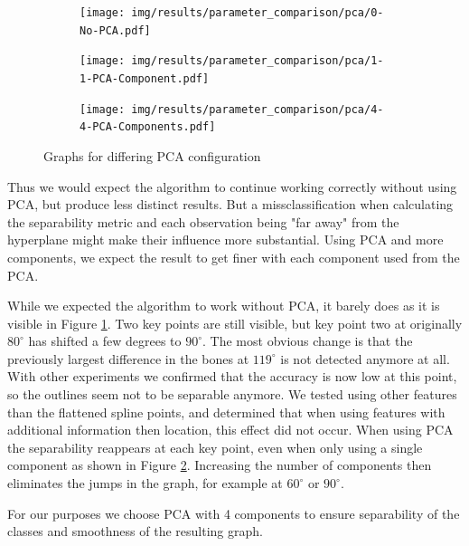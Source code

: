 \documentclass[pdftex,12pt,a4paper]{report}
\begin{document}
 \begin{figure}[h]
 	\centering
 	\begin{subfigure}[b]{0.32\textwidth}
 		\centering
 		\texttt{[image: img/results/parameter\_comparison/pca/0-No-PCA.pdf]}
 		\label{fig:pca-0}
 	\end{subfigure}
 	\begin{subfigure}[b]{0.32\textwidth}
 		\centering
 		\texttt{[image: img/results/parameter\_comparison/pca/1-1-PCA-Component.pdf]}
 		\label{fig:pca-1}
 	\end{subfigure}
 	\begin{subfigure}[b]{0.32\textwidth}
 		\centering
 		\texttt{[image: img/results/parameter\_comparison/pca/4-4-PCA-Components.pdf]}
 		\label{fig:pca-2}
 	\end{subfigure}
 	\caption{Graphs for differing PCA configuration}
 	\label{fig:pca}
 \end{figure}

Thus we would expect the algorithm to continue working correctly without using PCA, but produce less distinct results. But a missclassification when calculating the separability metric and each observation being "far away" from the hyperplane might make their influence more substantial. Using PCA and more components, we expect the result to get finer with each component used from the PCA.
 
While we expected the algorithm to work without PCA, it barely does as it is visible in Figure \ref{fig:pca-0}. Two key points are still visible, but key point two at originally $80^\circ$ has shifted a few degrees to $90^\circ$. The most obvious change is that the previously largest difference in the bones at $119^\circ$ is not detected anymore at all. With other experiments we confirmed that the accuracy is now low at this point, so the outlines seem not to be separable anymore. We tested using other features than the flattened spline points, and determined that when using features with additional information then location, this effect did not occur. When using PCA the separability reappears at each key point, even when only using a single component as shown in Figure \ref{fig:pca-1}. Increasing the number of components then eliminates the jumps in the graph, for example at $60^\circ$ or $90^\circ$.

For our purposes we choose PCA with 4 components to ensure separability of the classes and smoothness of the resulting graph.
\end{document}
